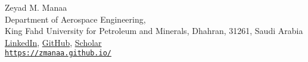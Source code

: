  {\hspace*{-\marginparsep minus \marginparwidth}%
\begin{minipage}[t]{\textwidth+\marginparwidth+\marginparsep}%
\centering
{\LARGE  {Zeyad M. Manaa}}\\
\vspace{0.2cm}
Department of Aerospace Engineering,\\
King Fahd University for Petroleum and Minerals, Dhahran, 31261, Saudi Arabia\\
\href{https://www.linkedin.com/in/zmanaa/}{{LinkedIn}},
\href{https://github.com/zmanaa}{{GitHub}},
\href{https://scholar.google.com/citations?user=pgB1sm8AAAAJ&hl=en}{{Scholar}} \\
\href{https://zmanaa.github.io/}{\texttt{https://zmanaa.github.io/}}\\
\vspace{0.3 cm}
\end{minipage}}
 \vspace{0. cm}